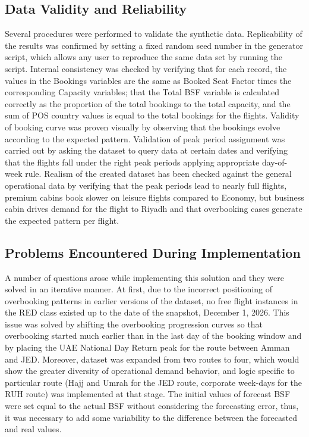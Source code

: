 \subsection{Data Validity and Reliability}

Several procedures were performed to validate the synthetic data. Replicability of the results was confirmed by setting a fixed random seed number in the generator script, which allows any user to reproduce the same data set by running the script. Internal consistency was checked by verifying that for each record, the values in the Bookings variables are the same as Booked Seat Factor times the corresponding Capacity variables; that the Total BSF variable is calculated correctly as the proportion of the total bookings to the total capacity, and the sum of POS country values is equal to the total bookings for the flights. Validity of booking curve was proven visually by observing that the bookings evolve according to the expected pattern. Validation of peak period assignment was carried out by asking the dataset to query data at certain dates and verifying that the flights fall under the right peak periods applying appropriate day-of-week rule. Realism of the created dataset has been checked against the general operational data by verifying that the peak periods lead to nearly full flights, premium cabins book slower on leisure flights compared to Economy, but business cabin drives demand for the flight to Riyadh and that overbooking cases generate the expected pattern per flight.

\subsection{Problems Encountered During Implementation}

A number of questions arose while implementing this solution and they were solved in an iterative manner. At first, due to the incorrect positioning of overbooking patterns in earlier versions of the dataset, no free flight instances in the RED class existed up to the date of the snapshot, December 1, 2026. This issue was solved by shifting the overbooking progression curves so that overbooking started much earlier than in the last day of the booking window and by placing the UAE National Day Return peak for the route between Amman and JED. Moreover, dataset was expanded from two routes to four, which would show the greater diversity of operational demand behavior, and logic specific to particular route (Hajj and Umrah for the JED route, corporate week-days for the RUH route) was implemented at that stage. The initial values of forecast BSF were set equal to the actual BSF without considering the forecasting error, thus, it was necessary to add some variability to the difference between the forecasted and real values.

